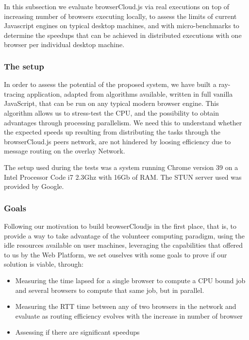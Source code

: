 In this subsection we evaluate browserCloud.js via real executions on top of increasing number of browsers executing locally, to assess the limits of current Javascript engines on typical desktop machines, and with micro-benchmarks to determine the speedups that can be achieved in distributed executions with one browser per individual desktop machine.

\subsubsection{The setup}

In order to assess the potential of the proposed system, we have built a ray-tracing application, adapted from algorithms available, written in full vanilla JavaScript, that can be run on any typical modern browser engine. This algorithm allows us to stress-test the CPU,  and the possibility to obtain advantages through processing parallelism. We need this to understand whether the expected speeds up resulting from distributing the tasks through the browserCloud.js peers network, are not hindered by loosing efficiency due to message routing on the overlay Network.

The setup used during the tests was a system running Chrome version 39 on a Intel Processor Code i7 2.3Ghz with 16Gb of RAM. The STUN server used was provided by Google.

\subsubsection{Goals}

Following our motivation to build browserCloudjs in the first place, that is, to provide a way to take advantage of the volunteer computing paradigm, using the idle resources available on user machines, leveraging the capabilities that offered to us by the Web Platform, we set ouselves with some goals to prove if our solution is viable, through:

\begin{itemize}
    \item Measuring the time lapsed for a single browser to compute a CPU bound job and several browsers to compute that same job, but in parallel.
    \item Measuring the RTT time between any of two browsers in the network and evaluate as routing efficiency evolves with the increase in number of browser
    \item Assessing if there are significant speedups
\end{itemize}

